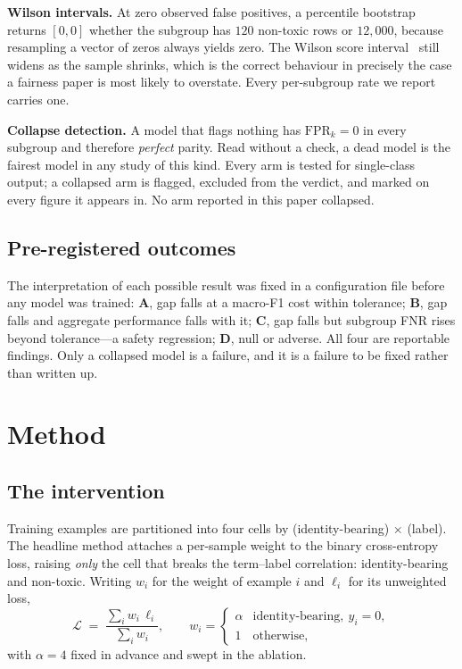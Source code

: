\documentclass[conference]{IEEEtran}
\begin{document}
\textbf{Wilson intervals.} At zero observed false positives, a percentile
bootstrap returns $[0,0]$ whether the subgroup has $120$ non-toxic rows or
$12{,}000$, because resampling a vector of zeros always yields zero. The Wilson
score interval~\cite{wilson1927} still widens as the sample shrinks, which is the
correct behaviour in precisely the case a fairness paper is most likely to
overstate. Every per-subgroup rate we report carries one.

\textbf{Collapse detection.} A model that flags nothing has $\mathrm{FPR}_k = 0$
in every subgroup and therefore \emph{perfect} parity. Read without a check, a
dead model is the fairest model in any study of this kind. Every arm is tested
for single-class output; a collapsed arm is flagged, excluded from the verdict,
and marked on every figure it appears in. No arm reported in this paper
collapsed.

\subsection{Pre-registered outcomes}
The interpretation of each possible result was fixed in a configuration file
before any model was trained: \textbf{A}, gap falls at a macro-F1 cost within
tolerance; \textbf{B}, gap falls and aggregate performance falls with it;
\textbf{C}, gap falls but subgroup FNR rises beyond tolerance---a safety
regression; \textbf{D}, null or adverse. All four are reportable findings. Only a
collapsed model is a failure, and it is a failure to be fixed rather than
written up.

\section{Method}

\subsection{The intervention}
Training examples are partitioned into four cells by (identity-bearing) $\times$
(label). The headline method attaches a per-sample weight to the binary
cross-entropy loss, raising \emph{only} the cell that breaks the term--label
correlation: identity-bearing and non-toxic. Writing $w_i$ for the weight of
example $i$ and $\ell_i$ for its unweighted loss,
\begin{equation}
\mathcal{L} \;=\; \frac{\sum_i w_i \,\ell_i}{\sum_i w_i},
\qquad
w_i =
\begin{cases}
\alpha & \text{identity-bearing},\ y_i = 0,\\
1 & \text{otherwise},
\end{cases}
\label{eq:loss}
\end{equation}
with $\alpha = 4$ fixed in advance and swept in the ablation.
\end{document}
